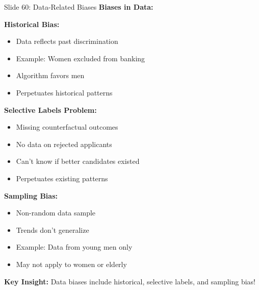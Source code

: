 \documentclass[8pt]{beamer}
\begin{document}
	\begin{frame}{Slide 60: Data-Related Biases}
		\fontsize{6.5}{7.5}\selectfont
		\textbf{Biases in Data:}
		
		\vspace{0.1cm}
		\textbf{Historical Bias:}
		\begin{itemize}
			\item Data reflects past discrimination
			\item Example: Women excluded from banking
			\item Algorithm favors men
			\item Perpetuates historical patterns
		\end{itemize}
		
		\vspace{0.1cm}
		\textbf{Selective Labels Problem:}
		\begin{itemize}
			\item Missing counterfactual outcomes
			\item No data on rejected applicants
			\item Can't know if better candidates existed
			\item Perpetuates existing patterns
		\end{itemize}
		
		\vspace{0.1cm}
		\textbf{Sampling Bias:}
		\begin{itemize}
			\item Non-random data sample
			\item Trends don't generalize
			\item Example: Data from young men only
			\item May not apply to women or elderly
		\end{itemize}
		
		\textcolor{myblue}{\textbf{Key Insight:}} Data biases include \textcolor{myblue}{historical, selective labels, and sampling bias}!
	\end{frame}
	
\end{document}
